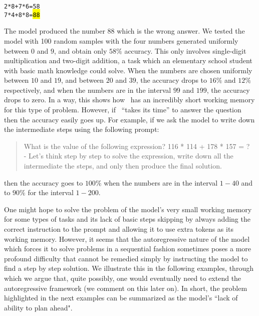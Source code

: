 \begin{AIbox}{\DV}
\scriptsize\vspace{-5px}
\parbox{1\textwidth}{
\begin{alltt}

2 * 8 + 7 * 6 = 58 \\

7 * 4 + 8 * 8 = \hl{88}

\end{alltt}
}
\end{AIbox}

The model produced the number $88$ which is the wrong answer. We tested the model with 100 random samples with the four numbers generated uniformly between $0$ and $9$, and obtain only $58\%$ accuracy. This only involves single-digit multiplication and two-digit addition, a task which an elementary school student with basic math knowledge could solve. When the numbers are chosen uniformly between $10$ and $19$, and between $20$ and $39$, the accuracy drops to $16\%$ and $12\%$ respectively, and when the numbers are in the interval $99$ and $199$, the accuracy drops to zero. In a way, this shows how \DV\ has an incredibly short working memory for this type of problem. However, if \DV\ ``takes its time'' to answer the question then the accuracy easily goes up. For example, if we ask the model to write down the intermediate steps using the following prompt:
\begin{quote}
What is the value of the following expression? 116 * 114 + 178 * 157 = ? \\
- Let's think step by step to solve the expression, write down all the intermediate the steps, and only then produce the final solution.
\end{quote}
then the accuracy goes to $100\%$ when the numbers are in the interval $1-40$ and to $90\%$ for the interval $1-200$.


One might hope to solve the problem of the model's very small working memory for some types of tasks and its lack of basic steps skipping by always adding the correct instruction to the prompt and allowing it to use extra tokens as its working memory. However, it seems that the autoregressive nature of the model which forces it to solve problems in a sequential fashion sometimes poses a more profound difficulty that cannot be remedied simply by instructing the model to find a step by step solution. We illustrate this in the following examples, through which we argue that, quite possibly, one would eventually need to extend the autoregressive framework (we comment on this later on). In short, the problem highlighted in the next examples can be summarized as the model's ``lack of ability to plan ahead".

